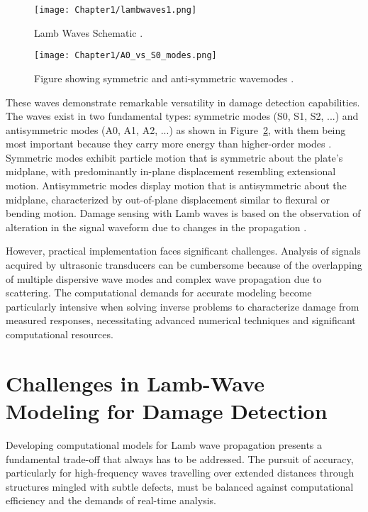 \documentclass[12pt,a4paper]{report}
\begin{document}
\begin{figure}[htbp]
    \centering
    \texttt{[image: Chapter1/lambwaves1.png]}
    \caption{Lamb Waves Schematic \citep{rose2014ultrasonic}.}
    \label{fig:fig1}
\end{figure}

\begin{figure}[htbp]
    \centering
    \texttt{[image: Chapter1/A0\_vs\_S0\_modes.png]}
    \caption{Figure showing symmetric and anti-symmetric wavemodes \citep{rose2014ultrasonic}.}
    \label{fig:S0andA0}
\end{figure}

\FloatBarrier   %

These waves demonstrate remarkable versatility in damage detection capabilities. The waves exist in two fundamental types: symmetric modes (S0, S1, S2, ...) and antisymmetric modes (A0, A1, A2, ...) as shown in Figure~\ref{fig:S0andA0}, with them being most important because they carry more energy than higher-order modes \citep{GIURGIUTIU2014293}. Symmetric modes exhibit particle motion that is symmetric about the plate's midplane, with predominantly in-plane displacement resembling extensional motion. Antisymmetric modes display motion that is antisymmetric about the midplane, characterized by out-of-plane displacement similar to flexural or bending motion. Damage sensing with Lamb waves is based on the observation of alteration in the signal waveform due to changes in the propagation  \citep{Muller2017}. 



However, practical implementation faces significant challenges. Analysis of signals acquired by ultrasonic transducers can be cumbersome because of the overlapping of multiple dispersive wave modes and complex wave propagation due to scattering. The computational demands for accurate modeling become particularly intensive when solving inverse problems to characterize damage from measured responses, necessitating advanced numerical techniques and significant computational resources.

\section{Challenges in Lamb-Wave Modeling for Damage Detection}
\label{challenges}

Developing computational models for Lamb wave propagation presents a fundamental trade-off that always has to be addressed. The pursuit of accuracy, particularly for high-frequency waves travelling over extended distances through structures mingled with subtle defects, must be balanced against computational efficiency and the demands of real-time analysis.
\end{document}
